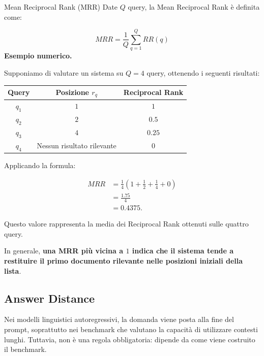 \begin{definition}{Mean Reciprocal Rank (MRR)}
Date $Q$ query, la Mean Reciprocal Rank è definita come:

\begin{equation}
    \boxed{
    MRR = \frac{1}{Q}\sum_{q=1}^{Q} RR(q)
    }
\end{equation}
\textbf{Esempio numerico.}

Supponiamo di valutare un sistema su $Q=4$ query, ottenendo i seguenti risultati:

\begin{center}
\begin{tabular}{|c|c|c|}
\hline
\textbf{Query} & \textbf{Posizione $r_q$} & \textbf{Reciprocal Rank} \\
\hline
$q_1$ & $1$ & $1$ \\
\hline
$q_2$ & $2$ & $0.5$ \\
\hline
$q_3$ & $4$ & $0.25$ \\
\hline
$q_4$ & Nessun risultato rilevante & $0$ \\
\hline
\end{tabular}
\end{center}

Applicando la formula:

\begin{equation}
\begin{aligned}
    MRR
    &= \frac{1}{4}
    \left(
        1+\frac{1}{2}+\frac{1}{4}+0
    \right) \\[6pt]
    &= \frac{1.75}{4} \\[6pt]
    &= \boxed{0.4375}.
\end{aligned}
\end{equation}

Questo valore rappresenta la media dei Reciprocal Rank ottenuti sulle quattro query.

In generale, \textbf{una MRR più vicina a $1$ indica che il sistema tende a restituire il primo documento rilevante nelle posizioni iniziali della lista}.
\end{definition}


\subsection{Answer Distance}
\begin{warning}{}
Nei modelli linguistici autoregressivi, la domanda viene posta alla fine del prompt, soprattutto nei benchmark che valutano la capacità di utilizzare contesti lunghi.
Tuttavia, non è una regola obbligatoria: dipende da come viene costruito il benchmark.
\end{warning}

